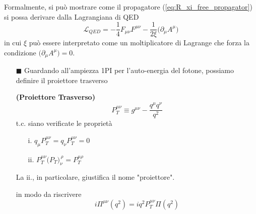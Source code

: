\documentclass[../main.tex]{subfiles}
\begin{document}
\begin{nota}
    Formalmente, si può mostrare come il propagatore (\ref{eq:R_xi_free_propagator}) si possa derivare dalla Lagrangiana di QED
    \[
    \mathscr{L}_{QED} = -\frac{1}{4}F_{\mu\nu}F^{\mu\nu}-\frac{1}{2\xi} \bigl(\partial_{\mu}A^\mu \bigr)
    \]
    in cui $\xi$ può essere interpretato come un moltiplicatore di Lagrange che forza la condizione $\bigl(\partial_{\mu}A^\mu \bigr)=0$.
\end{nota}
\begin{nota}
    \begin{itemize}
        \item[$\blacksquare$] Guardando all'ampiezza 1PI per l'auto-energia del fotone, possiamo definire il proiettore trasverso 
        \begin{definition}
            \textbf{(Proiettore Trasverso)} \[ P_T^{\mu\nu} \equiv g^{\mu\nu} - \frac{q^\mu q^\nu}{q^2}\] t.c. siano verificate le proprietà 
            \begin{enumerate}
                \item[i.] \( q_\mu P_T^{\mu\nu} = q_\nu P_T^{\mu\nu} = 0\)
                \item[ii.] \( P_T^{\mu\nu}\bigl(P_T\bigr)_{\nu}^{\,\rho} =  P_T^{\mu\rho} \)
            \end{enumerate}
            La ii., in particolare, giustifica il nome "proiettore".
        \end{definition}
        in modo da riscrivere 
        \begin{equation}
            i\Pi^{\mu\nu}(q^2) = iq^2 P_T^{\mu\nu}\Pi(q^2)
            \label{eq:Pi_munu_projector}
        \end{equation} 
        

\end{itemize}
\end{nota}
\end{document}
